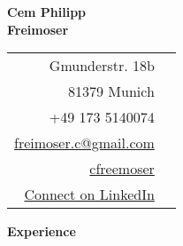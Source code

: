 \documentclass[letterpaper,12pt]{article}
\makeatletter
\def \firstname {Cem Philipp}
\def \lastname {Freimoser}
\def \linkedinicon {\faLinkedin}
\def \linkedintext {/dwight-schrute}
\def \homeicon {\faHome}
\def \homestreet {Gmunderstr. 18b}
\def \homecity {81379 Munich}
\def \phoneicon {\faPhone}
\def \phonetext {+49 173 5140074}
\def \emailicon {\faEnvelope}
\def \emaillink {mailto:freimoser.c@gmail.com}
\def \emailtext {freimoser.c@gmail.com}
\def \githubicon {\faGithub}
\def \githublink {https://github.com/cfreemoser}
\def \githubtext {cfreemoser}
\def \linkedinicon {\faLinkedin}
\def \linkedlink {https://www.linkedin.com/in/cem-philipp-freimoser-3b885011b/}
\def \linkedintext {Connect on LinkedIn}
\def \phone {\phonetext \hspace{3pt}\phoneicon}
\def \email {\href{\emaillink}{\emailtext}\hspace{3pt}\emailicon}
\def \github {\href{\githublink}{\githubtext}\hspace{3pt}\githubicon}
\def \home {\homestreet\hspace{3pt}\homeicon\\\homecity\makebox[1.5em]{}}
\def \linkedin {\href{\linkedlink}{\linkedintext}\hspace{3pt}\linkedinicon}
\renewcommand{\section}[2]{\vspace{5pt}
  \colorbox{teriary}{\color{white}\raggedbottom\normalsize\textbf{{#1}{\hspace{7pt}#2}}}
}
\makeatother
\begin{document}

\vspace{1cm} 
\begin{multicols}{2}
  \vspace{2cm}
  \textbf{\fontsize{28}{36}\selectfont \firstname}\\
  \textbf{\fontsize{28}{36}\selectfont  \lastname}
  
  \columnbreak
  
  \vspace{2cm}
  \begin{flushright}
      \begin{tabular}{rl}
          \home \\
          \phone \\
          \email \\
          \github \\
          \linkedin \\
       \end{tabular}
  \end{flushright}
\end{multicols}
\vspace{1cm}

\section{\faBusinessTime}{Experience}
\end{document}
